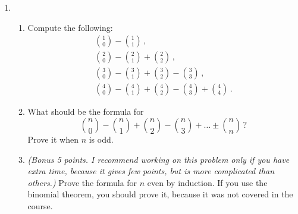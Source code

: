 \documentclass[12pt]{amsart}
\begin{document}
\begin{enumerate}[label=\arabic*.,itemsep=10pt, leftmargin=*]
    \item 
        \begin{enumerate}
            \item Compute the following:
                \begin{gather*}
                    \binom{1}{0} - \binom{1}{1} \,, \\
                    \binom{2}{0} - \binom{2}{1} + \binom{2}{2} \,, \\
                    \binom{3}{0} - \binom{3}{1} + \binom{3}{2} - \binom{3}{3} \,,
                \\
\binom{4}{0} - \binom{4}{1} + \binom{4}{2} - \binom{4}{3} + \binom{4}{4} \,.
                \end{gather*}
    \item
        What should be the formula for 
        \begin{equation*}
            \binom{n}{0} - \binom{n}{1} +
            \binom{n}{2} -
            \binom{n}{3} +
            \dots \pm \binom{n}{n} \,?
        \end{equation*}
        Prove it when $n$ is odd.
    \item
    \textit{(Bonus 5 points. I recommend working on this problem only if you have extra time, because it gives few points, but is more complicated than others.)}
    Prove the formula for $n$ even by induction. If you use the binomial theorem, you should prove it, because it was not covered in the course.
        \end{enumerate}


\end{enumerate}
\end{document}
